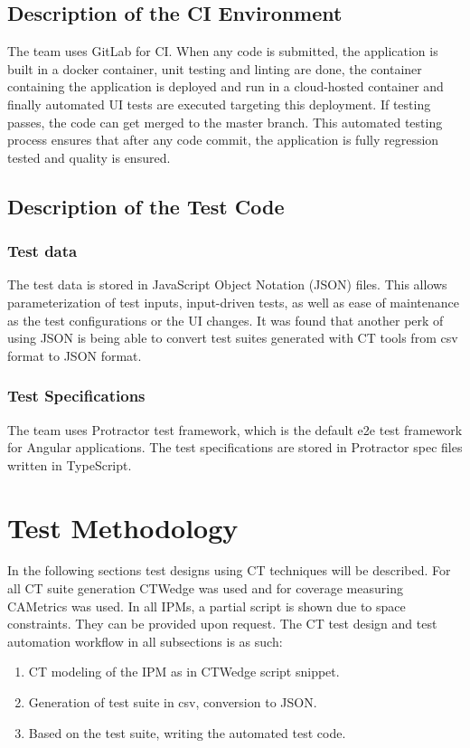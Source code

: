 \documentclass[conference]{IEEEtran}
\begin{document}
	\subsection{Description of the CI Environment }
	
	The team uses GitLab for CI.
	When any code is submitted, the application is built in a docker container, unit testing and linting are done, the container containing the application is deployed and run in a cloud-hosted container and finally automated UI tests are executed targeting this deployment.
	If testing passes, the code can get merged to the master branch. 
	This automated testing process ensures that after any code commit, the application is fully regression tested and quality is ensured. 

\subsection{Description of the Test Code}

	\subsubsection{Test data}
	The test data is stored in JavaScript Object Notation (JSON) files. 
	This allows parameterization of test inputs, input-driven tests, as well as ease of maintenance as the test configurations or the UI changes.
	It was found that another perk of using JSON is being able to convert test suites generated with CT tools from csv format to JSON format.

	\subsubsection{Test Specifications}

	The team uses Protractor test framework, which is the default e2e test framework for Angular applications.
	The test specifications are stored in Protractor spec files written in TypeScript. 

\section{Test Methodology}

	In the following sections test designs using CT techniques will be described. 
	For all CT suite generation CTWedge \cite{gargantini2018migrating} was used and for coverage measuring CAMetrics \cite{leithner2018cametrics} was used.
	In all IPMs, a partial script is shown due to space constraints. They can be provided upon request.
	The CT test design and test automation workflow in all subsections is as such:
	\begin{enumerate}
		\item CT modeling of the IPM as in CTWedge script snippet.
		\item Generation of test suite in csv, conversion to JSON.
		\item Based on the test suite, writing the automated test code.
	\end{enumerate}
	
\end{document}
